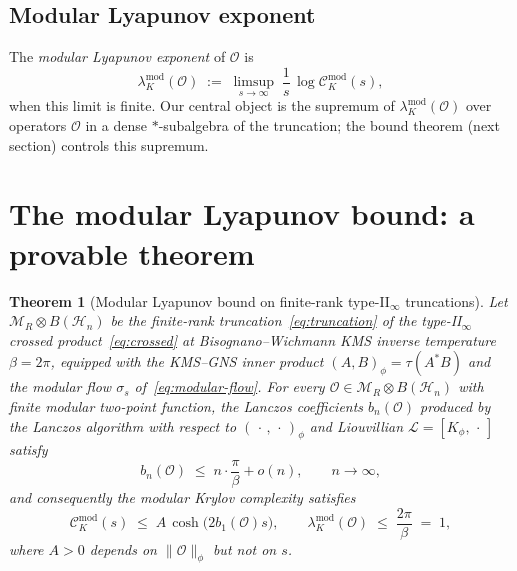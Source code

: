 \documentclass[12pt,a4paper]{article}
\newtheorem{theorem}{Theorem}
\begin{document}
\subsection{Modular Lyapunov exponent}

The \emph{modular Lyapunov exponent} of $\mathcal{O}$ is
\begin{equation}
  \lambda_K^{\mathrm{mod}}(\mathcal{O})
  \;:=\;
  \limsup_{s\to\infty}\;\frac{1}{s}\,
  \log \mathcal{C}_K^{\mathrm{mod}}(s),
\end{equation}
when this limit is finite.
Our central object is the supremum of $\lambda_K^{\mathrm{mod}}(\mathcal{O})$
over operators $\mathcal{O}$ in a dense $\ast$-subalgebra of the
truncation; the bound theorem (next section) controls this supremum.

\section{The modular Lyapunov bound: a provable theorem}
\label{sec:bound}

\begin{theorem}[Modular Lyapunov bound on finite-rank type-II$_\infty$
truncations]\label{thm:bound}
Let $\mathcal{M}_R \otimes B(\mathcal{H}_n)$ be the finite-rank
truncation~\eqref{eq:truncation} of the type-II$_\infty$ crossed
product~\eqref{eq:crossed} at Bisognano--Wichmann KMS inverse
temperature $\beta = 2\pi$, equipped with the KMS--GNS inner product
$(A,B)_\phi = \tau(A^* B)$ and the modular flow $\sigma_s$
of~\eqref{eq:modular-flow}.
For every $\mathcal{O} \in \mathcal{M}_R \otimes B(\mathcal{H}_n)$
with finite modular two-point function, the Lanczos coefficients
$b_n(\mathcal{O})$ produced by the Lanczos algorithm with respect
to $(\,\cdot\,,\,\cdot\,)_\phi$ and Liouvillian
$\mathcal{L} = [K_\phi,\,\cdot\,]$ satisfy
\begin{equation}
  b_n(\mathcal{O}) \;\le\; n\cdot\frac{\pi}{\beta} + o(n),
  \qquad n\to\infty,
  \label{eq:bn-bound}
\end{equation}
and consequently the modular Krylov complexity satisfies
\begin{equation}
  \mathcal{C}_K^{\mathrm{mod}}(s)
  \;\le\;
  A\,\cosh\!\bigl(2 b_1(\mathcal{O}) s\bigr),
  \qquad
  \lambda_K^{\mathrm{mod}}(\mathcal{O})
  \;\le\; \frac{2\pi}{\beta} \;=\; 1,
  \label{eq:bound-main}
\end{equation}
where $A>0$ depends on $\|\mathcal{O}\|_\phi$ but not on $s$.
\end{theorem}
\end{document}
